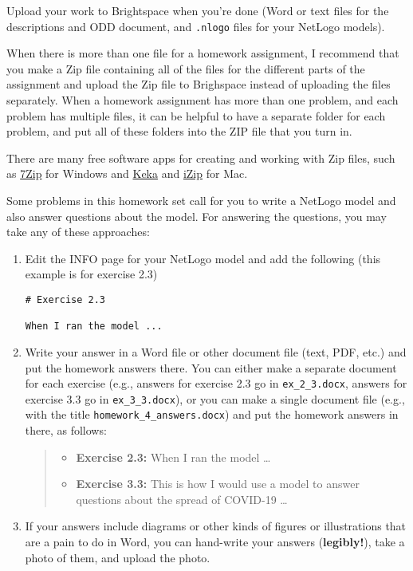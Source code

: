 \documentclass[
]{article}
\providecommand{\tightlist}{%
  \setlength{\itemsep}{0pt}\setlength{\parskip}{0pt}}
\begin{document}
Upload your work to Brightspace when you're done (Word or text files for
the descriptions and ODD document, and \texttt{.nlogo} files for your
NetLogo models).

When there is more than one file for a homework assignment, I recommend
that you make a Zip file containing all of the files for the different
parts of the assignment and upload the Zip file to Brighspace instead of
uploading the files separately. When a homework assignment has more than
one problem, and each problem has multiple files, it can be helpful to
have a separate folder for each problem, and put all of these folders
into the ZIP file that you turn in.

There are many free software apps for creating and working with Zip
files, such as \href{https://www.7-zip.org/}{7Zip} for Windows and
\href{https://www.keka.io/en/}{Keka} and
\href{https://www.izip.com}{iZip} for Mac.

Some problems in this homework set call for you to write a NetLogo model
and also answer questions about the model. For answering the questions,
you may take any of these approaches:

\begin{enumerate}
\def\labelenumi{\arabic{enumi}.}
\item
  Edit the INFO page for your NetLogo model and add the following (this
  example is for exercise 2.3)

\begin{verbatim}
# Exercise 2.3

When I ran the model ...
\end{verbatim}
\item
  Write your answer in a Word file or other document file (text, PDF,
  etc.) and put the homework answers there. You can either make a
  separate document for each exercise (e.g., answers for exercise 2.3 go
  in \texttt{ex\_2\_3.docx}, answers for exercise 3.3 go in
  \texttt{ex\_3\_3.docx}), or you can make a single document file (e.g.,
  with the title \texttt{homework\_4\_answers.docx}) and put the
  homework answers in there, as follows:

  \begin{quote}
  \begin{itemize}
  \tightlist
  \item
    \textbf{Exercise 2.3:} When I ran the model \ldots{}
  \item
    \textbf{Exercise 3.3:} This is how I would use a model to answer
    questions about the spread of COVID-19 \ldots{}
  \end{itemize}
  \end{quote}
\item
  If your answers include diagrams or other kinds of figures or
  illustrations that are a pain to do in Word, you can hand-write your
  answers (\textbf{legibly!}), take a photo of them, and upload the
  photo.
\end{enumerate}
\end{document}
